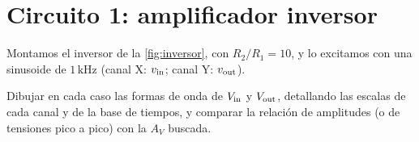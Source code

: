 \section{Circuito 1: amplificador inversor}\label{sec:inversor}
Montamos el inversor de la \cref{fig:inversor}, con $R_2/R_1=10$, y lo excitamos con una sinusoide de
$1\,\mathrm{kHz}$ (canal X: $v_{\mathrm{in}}$; canal Y: $v_{\mathrm{out}}$).



\begin{pregunta}
Dibujar en cada caso las formas de onda de $V_{\mathrm{in}}$ y $V_{\mathrm{out}}$, detallando las escalas de cada canal y de la base
de tiempos, y comparar la relación de amplitudes (o de tensiones pico a pico) con la $A_V$ buscada.
\end{pregunta}

